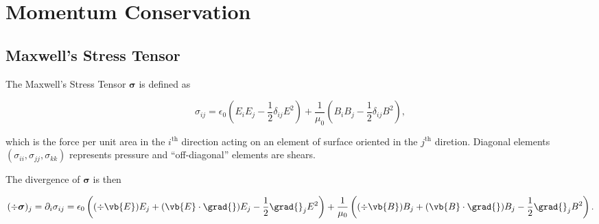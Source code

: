 \documentclass[english,a4paper,12pt]{report}
\begin{document}
\section{Momentum Conservation}

\subsection{Maxwell's Stress Tensor}

The Maxwell's Stress Tensor \(\boldsymbol{\sigma } \) is defined as 

\begin{equation}
    \sigma _{ij}  = \epsilon_0 \left( E_{i}E_{j} - \frac{1}{2} \delta _{ij} E^2     \right) + \frac{1}{\mu_0 }\left( B_{i}B_{j} - \frac{1}{2} \delta _{ij}B^2     \right),
\end{equation}

which is the force per unit area in the \(i^{\text{th}} \) direction acting on an element of surface oriented in the \(j^{\text{th}} \) diretion. Diagonal elements \((\sigma _{ii}, \sigma _{jj}, \sigma _{kk}  )\) represents pressure and ``off-diagonal'' elements are shears.

The divergence of \(\boldsymbol{\sigma }  \) is then 

\begin{equation}
    \begin{aligned}
        (\div{\boldsymbol{\sigma }  } )_{j} =  \partial _{i}\sigma _{ij} = \epsilon_0 \left( (\div{\vb{E} } )E_{j} + (\vb{E} \cdot \grad{} )E_{j} - \frac{1}{2}\grad{}_{j}E^2      \right) + \frac{1}{\mu_0 } \left( (\div{\vb{B} } )B_{j}+(\vb{B} \cdot \grad{} )B_{j}-\frac{1}{2}\grad{}_{j}B^2      \right).   
    \end{aligned}
\end{equation}
\end{document}
